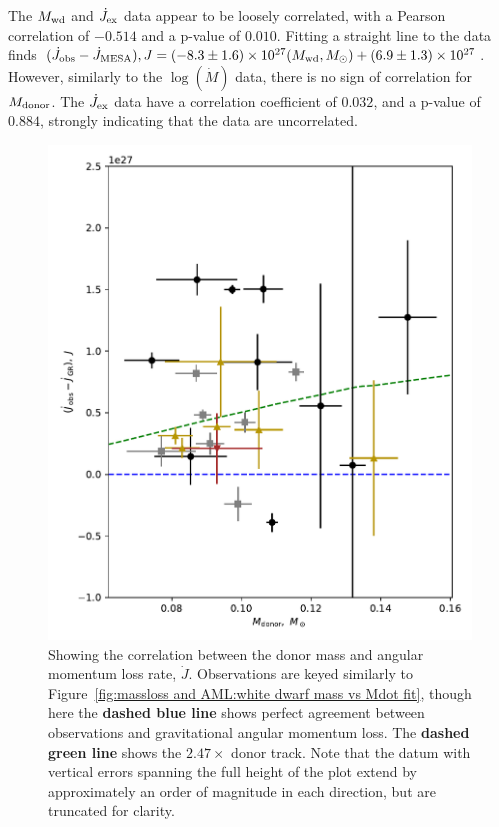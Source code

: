 The $M_{\rm wd}$ and $\dot J_{\rm ex}$ data appear to be loosely correlated, with a Pearson correlation of $-0.514$ and a p-value of $0.010$. Fitting a straight line to the data finds $(\dot J_{\rm obs} - \dot J_{\rm MESA}), J = (-8.3\pm1.6) \times 10^{27}(M_{\rm wd}, M_\odot) + (6.9\pm1.3)\times10^{27}$.
However, similarly to the $\log (\dot M)$ data, there is no sign of correlation for $M_{\rm donor}$. The $\dot J_{\rm ex}$ data have a correlation coefficient of $0.032$, and a p-value of $0.884$, strongly indicating that the data are uncorrelated.

\begin{figure}
    \centering
    \includegraphics[width=\textwidth]{figures/results/Mdot/Mr_Jdot_nofit.pdf}
    \caption{Showing the correlation between the donor mass and angular momentum loss rate, $\dot J$. Observations are keyed similarly to Figure~\ref{fig:massloss and AML:white dwarf mass vs Mdot fit}, though here the {\bf dashed blue line} shows perfect agreement between observations and gravitational angular momentum loss. The {\bf dashed green line} shows the $2.47\times$ donor track. Note that the datum with vertical errors spanning the full height of the plot extend by approximately an order of magnitude in each direction, but are truncated for clarity.}
    \label{fig:massloss and AML:donor mass vs Jdot fit}
\end{figure}
